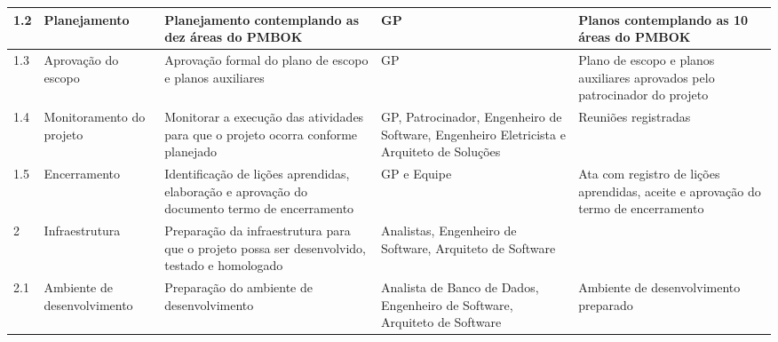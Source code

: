\begin{landscape}
\begin{longtable}{@{\extracolsep{\fill}}  l  p{}  p{}  p{}  p{}  }
		\midrule
		1.2         & Planejamento                                             & Planejamento contemplando as dez áreas do PMBOK                                                                                                                                 & GP                                                                                               & Planos contemplando as 10 áreas do PMBOK                                                                \\*
		\midrule
		1.3         & Aprovação do escopo                                    & Aprovação formal do plano de escopo e planos auxiliares                                                                                                                        & GP                                                                                               & Plano de escopo e planos auxiliares aprovados pelo patrocinador do projeto                               \\*
		\midrule
		1.4         & Monitoramento do projeto                                 & Monitorar a execução das atividades para que o projeto ocorra conforme planejado                                                                                               & GP, Patrocinador, Engenheiro de Software, Engenheiro Eletricista e Arquiteto de Soluções       & Reuniões registradas                                                                                    \\*
		\midrule
		1.5         & Encerramento                                             & Identificação de lições aprendidas, elaboração e aprovação do documento termo de encerramento                                                                            & GP e Equipe                                                                                      & Ata com registro de lições aprendidas, aceite e aprovação do termo de encerramento                   \\*
		\midrule
		2           & Infraestrutura                                           & Preparação da infraestrutura para que o projeto possa ser desenvolvido, testado e homologado                                                                                   & Analistas, Engenheiro de Software, Arquiteto de Software                                         &                                                                                                          \\*
		\midrule
		2.1         & Ambiente de desenvolvimento                              & Preparação do ambiente de desenvolvimento                                                                                                                                      & Analista de Banco de Dados, Engenheiro de Software, Arquiteto de Software                        & Ambiente de desenvolvimento preparado                                                                    \\*

\end{longtable}
\end{landscape}
